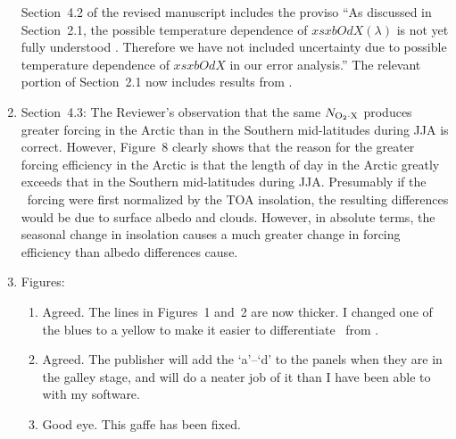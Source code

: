 \documentclass[12pt,twoside]{article}
\begin{document}
\begin{enumerate}
Section~4.2 of the revised manuscript includes the proviso
``As discussed in Section~2.1, the possible temperature dependence of 
$xsxbOdX(\lambda)$ is not yet fully understood
\cite[]{GOB90,NeB98,OFH98}.     
Therefore we have not included uncertainty due to possible temperature
dependence of $xsxbOdX$ in our error analysis.''
The relevant portion of Section~2.1 now includes results from
\cite{OFH98}. 

\item Section~4.3:
The Reviewer's observation that the same $N_{\mathrm{O}_{2} \cdot \mathrm{X}}$ produces greater
forcing in the Arctic than in the Southern mid-latitudes during JJA
is correct.
However, Figure~8 clearly shows that the reason for the greater
forcing efficiency in the Arctic is that the length of day in the
Arctic greatly exceeds that in the Southern mid-latitudes during JJA. 
Presumably if the \OdX\ forcing were first normalized by the TOA
insolation, the resulting differences would be due to surface albedo
and clouds.
However, in absolute terms, the seasonal change in insolation causes
a much greater change in forcing efficiency than albedo differences
cause. 

\item Figures: 
\begin{enumerate}
\item Agreed. 
The lines in Figures~1 and~2 are now thicker.
I changed one of the blues to a yellow to make it easier to
differentiate \Od\ from \OdNd. 
\item Agreed.
The publisher will add the `a'--`d' to the panels when they are in the
galley stage, and will do a neater job of it than I have been able to
with my software.    
\item Good eye. 
This gaffe has been fixed.
\end{enumerate}
\end{enumerate}

\renewcommand\refname{\normalsize References}


\end{document}

